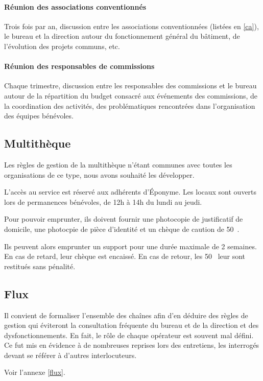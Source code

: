 \paragraph{Réunion des associations conventionnés} Trois fois par an,
discussion entre les associations conventionnées (listées en \ref{ca}),
le bureau et la direction autour du fonctionnement général du bâtiment,
de l'évolution des projets communs, etc.

\paragraph{Réunion des responsables de commissions} Chaque trimestre,
discussion entre les responsables des commissions et le bureau
autour de la répartition du budget consacré aux événements des commissions,
de la coordination des activités, des problématiques rencontrées dans
l'organisation des équipes bénévoles.

\subsection{Multithèque}
\label{multitheque}

Les règles de gestion de la multithèque n'étant communes avec toutes les
organisations de ce type, nous avons souhaité les développer.

L'accès au service est réservé aux adhérents d'Éponyme. Les locaux sont ouverts
lors de permanences bénévoles, de 12h à 14h du lundi au jeudi.

Pour pouvoir emprunter, ils doivent fournir une photocopie de justificatif de domicile,
une photocpie de pièce d'identité et un chèque de caution de 50~{\texteuro}.

Ils peuvent alors emprunter un support pour une durée maximale de 2 semaines.
En cas de retard, leur chèque est encaissé. En cas de retour, les 50~{\texteuro}
leur sont restitués sans pénalité.

\subsection{Flux}

Il convient de formaliser l'ensemble des chaînes afin d'en déduire des règles
de gestion qui éviteront la consultation fréquente du bureau et de la direction
et des dysfonctionnements. En fait, le rôle de chaque opérateur est souvent
mal défini. Ce fut mis en évidence à de nombreuses reprises lors des entretiens,
les interrogés devant se référer à d'autres interlocuteurs.

Voir l'annexe \ref{flux}.